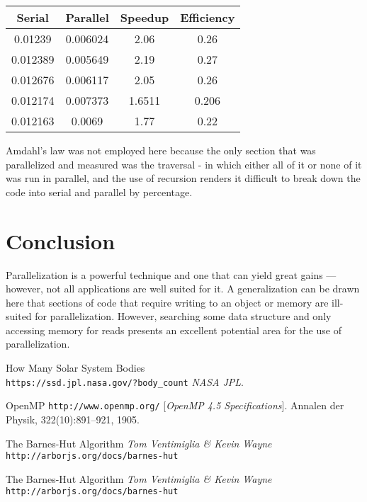 \documentclass[11pt]{article}
\begin{document}
\begin{table}[!htbp]
\centering
\begin{tabular}{|c|c|c|c|}
\hline
	Serial & Parallel & Speedup & Efficiency\\
\hline
	  0.01239 & 0.006024 & 2.06 & 0.26\\
\hline
	0.012389 & 0.005649 & 2.19 & 0.27\\
\hline
	0.012676 &  0.006117 & 2.05 & 0.26\\
\hline
	 0.012174 & 0.007373 & 1.6511 & 0.206\\
\hline
	0.012163 & 0.0069 & 1.77 & 0.22\\
\hline
\end{tabular}
\end{table}

Amdahl's law was not employed here because the only section that was parallelized and measured was the traversal - in which either all of it or none of it was run in parallel, and the use of recursion renders it difficult to break down the code into serial and parallel by percentage.


\section{Conclusion}
Parallelization is a powerful technique and one that can yield great gains --- however, not all applications are well suited for it. A generalization can be drawn here that sections of code that require writing to an object or memory are ill-suited for parallelization. However, searching some data structure and only accessing memory for reads presents an excellent potential area for the use of parallelization. 


\begin{thebibliography}{9}
How Many Solar System Bodies
\\\texttt{https://ssd.jpl.nasa.gov/?body\_count}
\textit{NASA JPL}. 
 
OpenMP
\texttt{http://www.openmp.org/}
[\textit{OpenMP 4.5 Specifications}]. 
Annalen der Physik, 322(10):891–921, 1905.
 
The Barnes-Hut Algorithm
\textit{Tom Ventimiglia \& Kevin Wayne}
\\\texttt{http://arborjs.org/docs/barnes-hut}

The Barnes-Hut Algorithm
\textit{Tom Ventimiglia \& Kevin Wayne}
\\\texttt{http://arborjs.org/docs/barnes-hut}
\end{thebibliography}
\end{document}

